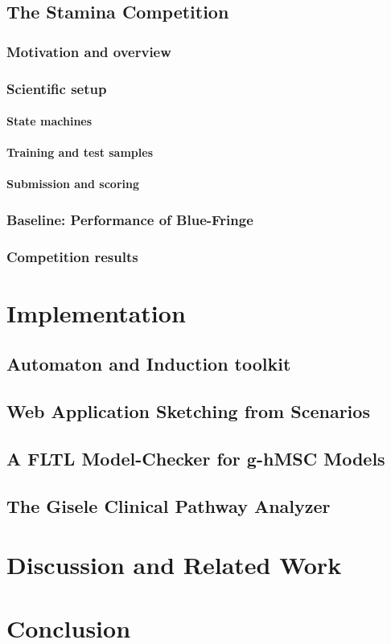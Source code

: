 \documentclass[dvips,a4paper,11pt]{report}
\begin{document}
  \section{The Stamina Competition\label{section_stamina}}
    \subsection{Motivation and overview\label{subsection_stamina_overview}}
    \subsection{Scientific setup\label{subsection_stamina_setup}}
      \subsubsection*{State machines}
      \subsubsection*{Training and test samples}
      \subsubsection*{Submission and scoring}
    \subsection{Baseline: Performance of Blue-Fringe\label{subsection_stamina_baseline}}
    \subsection{Competition results\label{subsection_stamina_results}}
\chapter{Implementation}
  \section{Automaton and Induction toolkit}
  \section{Web Application Sketching from Scenarios}
  \section{A FLTL Model-Checker for g-hMSC Models}
  \section{The Gisele Clinical Pathway Analyzer}
\chapter{Discussion and Related Work}
\chapter{Conclusion}


\end{document}
